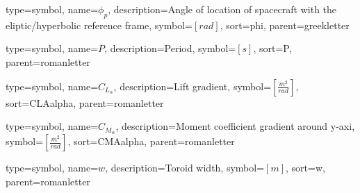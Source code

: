 {
type=symbol, %
name={\ensuremath{\phi_p}}, %
description={Angle of location of spacecraft with the eliptic/hyperbolic reference frame}, %
symbol={$\left[rad\right]$}, %
sort=phi, %
parent=greekletter %
}

{
	type=symbol, %
	name={\ensuremath{P}}, %
	description={Period}, %
	symbol={$\left[s\right]$}, %
	sort=P, %
	parent=romanletter %
}

{
	type=symbol, %
	name={\ensuremath{C_{L_\alpha}}}, %
	description={Lift gradient}, %
	symbol={$\left[\frac{m^2}{rad}\right]$}, %
	sort=CLAalpha, %
	parent=romanletter %
}

{
	type=symbol, %
	name={\ensuremath{C_{M_\alpha}}}, %
	description={Moment coefficient gradient around y-axi}, %
	symbol={$\left[\frac{m^2}{rad}\right]$}, %
	sort=CMAalpha, %
	parent=romanletter %
}

{
	type=symbol, %
	name={\ensuremath{w}}, %
	description={Toroid width}, %
	symbol={$\left[m\right]$}, %
	sort=w, %
	parent=romanletter %
}

